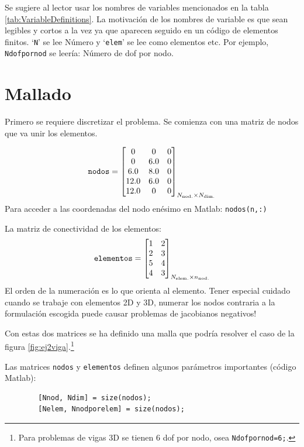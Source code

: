\documentclass[11pt, a4paper,titlepage]{article}
\newcommand{\rmfont}[1]{{\fontfamily{ptm}\selectfont%
#1}}
\newcommand{\Matlab}{\rmfont{\sc Matlab}}
\begin{document}
Se sugiere al lector usar los nombres de variables mencionados en la tabla \ref{tab:VariableDefinitions}. La motivación de los nombres de variable es que sean legibles y cortos a la vez ya que aparecen seguido en un código de elementos finitos. `\texttt{N}' se lee Número y `\texttt{elem}' se lee como elementos etc. Por ejemplo, \texttt{Ndofpornod} se leería: Número de dof por nodo.

\section{Mallado}
Primero se requiere discretizar el problema. Se comienza con una matriz de nodos que va unir los elementos. 

\begin{equation}
	\texttt{nodos} = \begin{bmatrix}
	0 & 0 & 0 \\
	0 & 6.0 & 0 \\
	6.0 & 8.0 & 0 \\
	12.0 & 6.0 & 0 \\
	12.0 & 0 & 0
	\end{bmatrix}_{ N_{\mathrm{nod.}} \times N_{\mathrm{dim.}} }
\end{equation}
Para acceder a las coordenadas del nodo enésimo en \Matlab: \texttt{nodos(n,:)}

La matriz de conectividad de los elementos:
\begin{equation} \label{eq:MatrizElementosEjemplo}
\texttt{elementos} = \begin{bmatrix}
1 & 2  \\
2 & 3  \\
5 & 4 \\
4 & 3 
\end{bmatrix}_{ N_{\mathrm{elem.}} \times n_{\mathrm{nod.}} } 
\end{equation}
El orden de la numeración es lo que orienta al elemento. Tener especial cuidado cuando se trabaje con elementos 2D y 3D, numerar los nodos contraria a la formulación escogida puede causar problemas de jacobianos negativos!

Con estas dos matrices se ha definido una malla que podría resolver el caso de la figura \ref{fig:ej2viga}.\footnote{Para problemas de vigas 3D se tienen 6 dof por nodo, osea \texttt{Ndofpornod=6;}.}

Las matrices \texttt{nodos} y \texttt{elementos} definen algunos parámetros importantes (código \Matlab):
\begin{verbatim}
	    [Nnod, Ndim] = size(nodos);
	    [Nelem, Nnodporelem] = size(nodos);
\end{verbatim}
\end{document}
